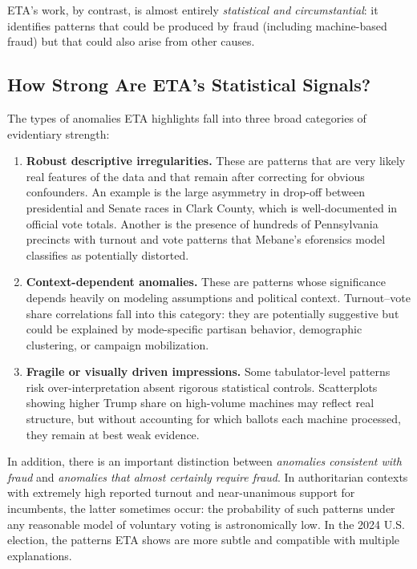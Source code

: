 \documentclass[12pt]{article}
\begin{document}
ETA's work, by contrast, is almost entirely \emph{statistical and circumstantial}: it identifies patterns that could be produced by fraud (including machine-based fraud) but that could also arise from other causes.

\subsection{How Strong Are ETA's Statistical Signals?}

The types of anomalies ETA highlights fall into three broad categories of evidentiary strength:

\begin{enumerate}
    \item \textbf{Robust descriptive irregularities.} These are patterns that are very likely real features of the data and that remain after correcting for obvious confounders. An example is the large asymmetry in drop-off between presidential and Senate races in Clark County, which is well-documented in official vote totals. Another is the presence of hundreds of Pennsylvania precincts with turnout and vote patterns that Mebane's eforensics model classifies as potentially distorted.

    \item \textbf{Context-dependent anomalies.} These are patterns whose significance depends heavily on modeling assumptions and political context. Turnout--vote share correlations fall into this category: they are potentially suggestive but could be explained by mode-specific partisan behavior, demographic clustering, or campaign mobilization.

    \item \textbf{Fragile or visually driven impressions.} Some tabulator-level patterns risk over-interpretation absent rigorous statistical controls. Scatterplots showing higher Trump share on high-volume machines may reflect real structure, but without accounting for which ballots each machine processed, they remain at best weak evidence.
\end{enumerate}

In addition, there is an important distinction between \emph{anomalies consistent with fraud} and \emph{anomalies that almost certainly require fraud}. In authoritarian contexts with extremely high reported turnout and near-unanimous support for incumbents, the latter sometimes occur: the probability of such patterns under any reasonable model of voluntary voting is astronomically low. In the 2024 U.S. election, the patterns ETA shows are more subtle and compatible with multiple explanations.
\end{document}
